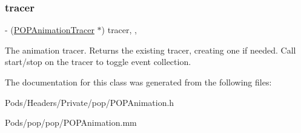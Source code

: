 \subsubsection{\texorpdfstring{tracer}{tracer}}
{\footnotesize\ttfamily -\/ (\mbox{\hyperlink{interface_p_o_p_animation_tracer}{P\+O\+P\+Animation\+Tracer}} $\ast$) tracer\hspace{0.3cm}{\ttfamily [read]}, {\ttfamily [nonatomic]}, {\ttfamily [assign]}}

The animation tracer.  Returns the existing tracer, creating one if needed. Call start/stop on the tracer to toggle event collection. 

The documentation for this class was generated from the following files\+:\begin{DoxyCompactItemize}
\item 
Pods/\+Headers/\+Private/pop/P\+O\+P\+Animation.\+h\item 
Pods/pop/pop/P\+O\+P\+Animation.\+mm\end{DoxyCompactItemize}

